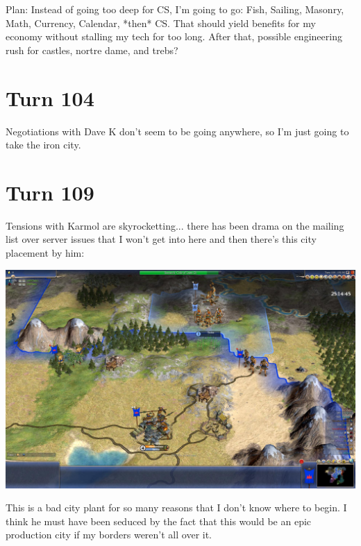 \documentclass[10pt]{article}
\begin{document}
Plan: Instead of going too deep for CS, I'm going to go: Fish,
Sailing, Masonry, Math, Currency, Calendar, *then* CS. That should
yield benefits for my economy without stalling my tech for too
long. After that, possible engineering rush for castles, nortre dame,
and trebs?

\section*{Turn 104}

Negotiations with Dave K don't seem to be going anywhere, so I'm just going to take the iron city.

\section*{Turn 109}

Tensions with Karmol are skyrocketting... there has been drama on the
mailing list over server issues that I won't get into here and then
there's this city placement by him:

\includegraphics[width=1.0\textwidth]{turn109}

This is a bad city plant for so many reasons that I don't know where
to begin. I think he must have been seduced by the fact that this
would be an epic production city if my borders weren't all over it.
\end{document}
